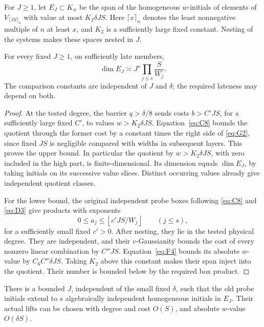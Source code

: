 For \(J\ge1\), let \(E_J\subset K_w\) be the span of the
homogeneous \(w\)-initials of elements of
\(V_{\lceil JS\rceil_n}\) with value at most \(K_2\delta JS\).
Here \(\lceil x\rceil_n\) denotes the least nonnegative multiple
of \(n\) at least \(x\), and \(K_2\) is a sufficiently large
fixed constant.  Nesting of the systems makes these spaces
nested in \(J\).

\begin{lemma}\label{c:layer-dimension}
For every fixed \(J\ge1\), on sufficiently late members,
\begin{equation}\label{eq:G2}
                   \dim E_J\asymp
                      J^s\prod_{j\le s}\frac{S}{W_j}.
\end{equation}
The comparison constants are independent of \(J\) and
\(\delta\); the required lateness may depend on both.
\end{lemma}

\begin{proof}
At the tested degree, the barrier \(q>\delta/8\) sends costs
\(b>C'JS\), for a sufficiently large fixed \(C'\), to values
\(w>K_2\delta JS\).  Equation~\eqref{eq:C8} bounds the quotient
through the former cost by a constant times the right side
of \eqref{eq:G2}, since fixed \(JS\) is negligible compared
with widths in subsequent layers.  This proves the upper
bound.  In particular the quotient by \(w>K_2\delta JS\),
with zero included in the high part, is finite-dimensional.
Its dimension equals \(\dim E_J\), by taking initials on its
successive value slices.  Distinct occurring values already
give independent quotient classes.

For the lower bound, the original independent probe boxes
following \eqref{eq:C8} and \eqref{eq:D3} give products with
exponents
\[
               0\le a_j\le\left\lfloor c'JS/W_j\right\rfloor
                         \qquad(j\le s),
\]
for a sufficiently small fixed \(c'>0\).
After nesting, they lie in the tested physical degree.
They are independent, and their \(v\)-Gaussianity bounds the
cost of every nonzero linear combination by \(C''JS\).
Equation~\eqref{eq:F4} bounds its absolute \(w\)-value by
\(C_6C''\delta JS\).  Taking \(K_2\) above this constant
makes their span inject into the quotient.  Their number
is bounded below by the required box product.
\end{proof}

\begin{proposition}\label{c:rank-increase}
There is a bounded \(J\), independent of the small fixed
\(\delta\), such that the old probe initials extend to \(s\)
algebraically independent homogeneous initials in \(E_J\).
Their actual lifts can be chosen with degree and cost
\(O(S)\), and absolute \(w\)-value \(O(\delta S)\).
\end{proposition}

